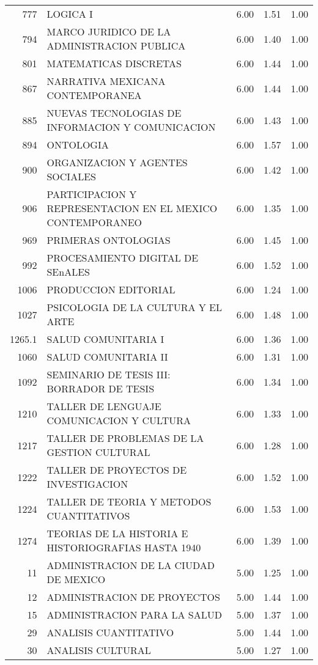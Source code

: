 \begin{table}[ht]
\begin{tabular}{rlrrr}
  777 & LOGICA I & 6.00 & 1.51 & 1.00 \\ 
  794 & MARCO JURIDICO DE LA ADMINISTRACION PUBLICA & 6.00 & 1.40 & 1.00 \\ 
  801 & MATEMATICAS DISCRETAS & 6.00 & 1.44 & 1.00 \\ 
  867 & NARRATIVA MEXICANA CONTEMPORANEA & 6.00 & 1.44 & 1.00 \\ 
  885 & NUEVAS TECNOLOGIAS DE INFORMACION Y COMUNICACION & 6.00 & 1.43 & 1.00 \\ 
  894 & ONTOLOGIA & 6.00 & 1.57 & 1.00 \\ 
  900 & ORGANIZACION Y AGENTES SOCIALES & 6.00 & 1.42 & 1.00 \\ 
  906 & PARTICIPACION Y REPRESENTACION EN EL MEXICO CONTEMPORANEO & 6.00 & 1.35 & 1.00 \\ 
  969 & PRIMERAS ONTOLOGIAS & 6.00 & 1.45 & 1.00 \\ 
  992 & PROCESAMIENTO DIGITAL DE SEnALES & 6.00 & 1.52 & 1.00 \\ 
  1006 & PRODUCCION EDITORIAL & 6.00 & 1.24 & 1.00 \\ 
  1027 & PSICOLOGIA DE LA CULTURA Y EL ARTE & 6.00 & 1.48 & 1.00 \\ 
  1265.1 & SALUD COMUNITARIA I & 6.00 & 1.36 & 1.00 \\ 
  1060 & SALUD COMUNITARIA II & 6.00 & 1.31 & 1.00 \\ 
  1092 & SEMINARIO DE TESIS III: BORRADOR DE TESIS & 6.00 & 1.34 & 1.00 \\ 
  1210 & TALLER DE LENGUAJE COMUNICACION Y CULTURA & 6.00 & 1.33 & 1.00 \\ 
  1217 & TALLER DE PROBLEMAS DE LA GESTION CULTURAL & 6.00 & 1.28 & 1.00 \\ 
  1222 & TALLER DE PROYECTOS DE INVESTIGACION & 6.00 & 1.52 & 1.00 \\ 
  1224 & TALLER DE TEORIA Y METODOS CUANTITATIVOS & 6.00 & 1.53 & 1.00 \\ 
  1274 & TEORIAS DE LA HISTORIA E HISTORIOGRAFIAS HASTA 1940 & 6.00 & 1.39 & 1.00 \\ 
  11 & ADMINISTRACION DE LA CIUDAD DE MEXICO & 5.00 & 1.25 & 1.00 \\ 
  12 & ADMINISTRACION DE PROYECTOS & 5.00 & 1.44 & 1.00 \\ 
  15 & ADMINISTRACION PARA LA SALUD & 5.00 & 1.37 & 1.00 \\ 
  29 & ANALISIS CUANTITATIVO & 5.00 & 1.44 & 1.00 \\ 
  30 & ANALISIS CULTURAL & 5.00 & 1.27 & 1.00 \\ 

\end{tabular}
\end{table}
